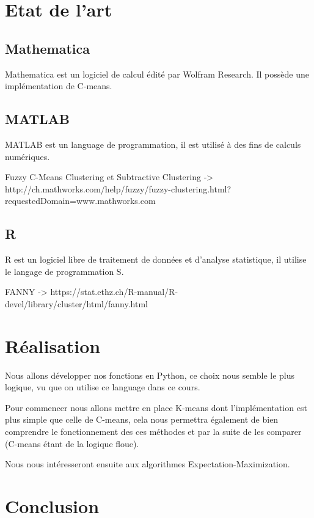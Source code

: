 \documentclass{article}
\begin{document}
  \section{Etat de l'art}

  \subsection{Mathematica}

  Mathematica est un logiciel de calcul édité par Wolfram Research. Il possède une implémentation de C-means.

  \subsection{MATLAB}

  MATLAB est un language de programmation, il est utilisé à des fins de calculs numériques.

  Fuzzy C-Means Clustering et Subtractive Clustering -> http://ch.mathworks.com/help/fuzzy/fuzzy-clustering.html?requestedDomain=www.mathworks.com

  \subsection{R}

  R est un logiciel libre de traitement de données et d'analyse statistique, il utilise le langage de programmation S.

  FANNY -> https://stat.ethz.ch/R-manual/R-devel/library/cluster/html/fanny.html

  \section{Réalisation}

  Nous allons développer nos fonctions en Python, ce choix nous semble le plus logique, vu que on utilise ce language dans ce cours.

  Pour commencer nous allons mettre en place K-means dont l'implémentation est plus simple que celle de C-means,
  cela nous permettra également de bien comprendre le fonctionnement des ces méthodes et par la suite de les comparer (C-means étant de la logique floue).

  Nous nous intéresseront ensuite aux algorithmes Expectation-Maximization.

  \section{Conclusion}


\nocite{*}
\end{document}
